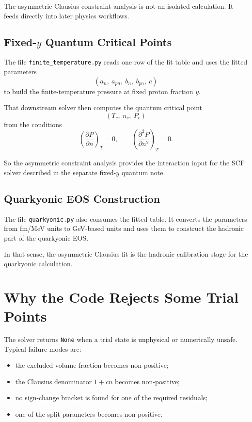 \documentclass[11pt]{article}
\begin{document}
The asymmetric Clausius constraint analysis is not an isolated calculation. It
feeds directly into later physics workflows.

\subsection{Fixed-\texorpdfstring{$y$}{y} Quantum Critical Points}

The file \texttt{finite\_temperature.py} reads one row of the fit table and
uses the fitted parameters
\[
(a_n,\ a_{pn},\ b_n,\ b_{pn},\ c)
\]
to build the finite-temperature pressure at fixed proton fraction $y$.

That downstream solver then computes the quantum critical point
\[
(T_c,\ n_c,\ P_c)
\]
from the conditions
\[
\left(\frac{\partial P}{\partial n}\right)_T = 0,
\qquad
\left(\frac{\partial^2 P}{\partial n^2}\right)_T = 0.
\]

So the asymmetric constraint analysis provides the interaction input for the
SCF solver described in the separate fixed-$y$ quantum note.

\subsection{Quarkyonic EOS Construction}

The file \texttt{quarkyonic.py} also consumes the fitted table. It converts the
parameters from fm/MeV units to GeV-based units and uses them to construct the
hadronic part of the quarkyonic EOS.

In that sense, the asymmetric Clausius fit is the hadronic calibration stage
for the quarkyonic calculation.

\section{Why the Code Rejects Some Trial Points}

The solver returns \texttt{None} when a trial state is unphysical or numerically
unsafe. Typical failure modes are:
\begin{itemize}
\item the excluded-volume fraction becomes non-positive;
\item the Clausius denominator $1 + c n$ becomes non-positive;
\item no sign-change bracket is found for one of the required residuals;
\item one of the split parameters becomes non-positive.
\end{itemize}
\end{document}
